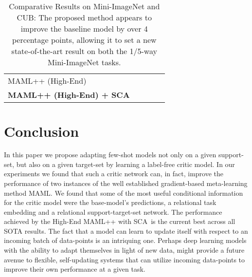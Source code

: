 \documentclass{article} \usepackage[dvipsnames]{xcolor}
\newcommand{\proposedmethod}{SCA}
\newcommand{\proposedmethodspace}{SCA\ }
\begin{document}
\begin{table}[!htb]
{\begin{tabular}{ l | c c c c}
 MAML++ (High-End)                              &         &  & 	              &  \\ 
 \textbf{MAML++ (High-End) + \proposedmethod}   & &  &         &  \\
 \hline
\end{tabular}
}
\vspace{1.0mm}
\caption{Comparative Results on Mini-ImageNet and CUB: The proposed method appears to improve the baseline model by over 4 percentage points, allowing it to set a new state-of-the-art result on both the 1/5-way Mini-ImageNet tasks.}
\label{table:comparative}
\vspace{-4.0mm}
\end{table}







\section{Conclusion}
In this paper we propose adapting few-shot models not only on a given support-set, but also on a given target-set by learning a label-free critic model. In our experiments we found that such a critic network can, in fact, improve the performance of two instances of the well established gradient-based meta-learning method MAML. We found that some of the most useful conditional information for the critic model were the base-model's predictions, a relational task embedding and a relational support-target-set network. The performance achieved by the High-End MAML++ with \proposedmethodspace is the current best across all SOTA results. The fact that a model can learn to update itself with respect to an incoming batch of data-points is an intriquing one. Perhaps deep learning models with the ability to adapt themselves in light of new data, might provide a future avenue to flexible, self-updating systems that can utilize incoming data-points to improve their own performance at a given task.
\end{document}
